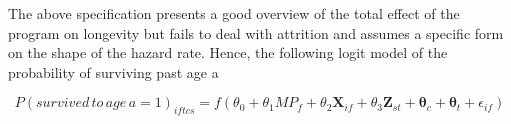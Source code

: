 The above specification presents a good overview of the total effect of the program on longevity but fails to deal with attrition and assumes a specific form on the shape of the hazard rate. Hence, the following logit model of the probability of surviving past age a

$$
P(survived\,to\,age\,a=1)_{iftcs} = f(\theta_0 + \theta_1MP_f + \theta_2\mathbf{X}_{if} + \theta_3\mathbf{Z}_{st} + \mathbf{\theta}_c + \mathbf{\theta}_t + \epsilon_{if})
$$